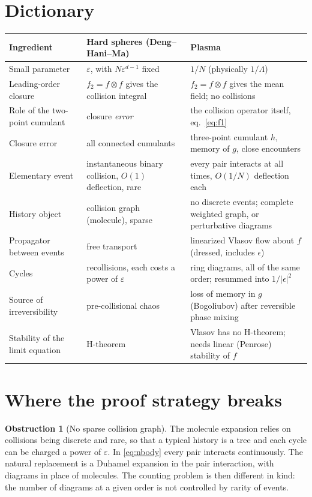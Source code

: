 \documentclass[11pt]{article}
\newcommand{\eps}{\varepsilon}
\newcommand{\diel}{\epsilon}
\theoremstyle{definition}
\newtheorem{obstruction}{Obstruction}
\begin{document}
\section{Dictionary}

\begin{center}
\renewcommand{\arraystretch}{1.5}
\begin{tabular}{>{\raggedright}p{3.1cm}>{\raggedright}p{5.2cm}p{6.2cm}}
  Ingredient & Hard spheres (Deng--Hani--Ma) & Plasma \\ \hline
  Small parameter & $\eps$, with $N\eps^{d-1}$ fixed
    & $1/N$ (physically $1/\Lambda$) \\
  Leading-order closure & $f_2 = f\otimes f$ gives the collision integral
    & $f_2 = f\otimes f$ gives the mean field; no collisions \\
  Role of the two-point cumulant & closure \emph{error}
    & the collision operator itself, eq.~\eqref{eq:f1} \\
  Closure error & all connected cumulants
    & three-point cumulant $h$, memory of $g$, close encounters \\
  Elementary event & instantaneous binary collision, $O(1)$ deflection, rare
    & every pair interacts at all times, $O(1/N)$ deflection each \\
  History object & collision graph (molecule), sparse
    & no discrete events; complete weighted graph, or perturbative diagrams \\
  Propagator between events & free transport
    & linearized Vlasov flow about $f$ (dressed, includes $\diel$) \\
  Cycles & recollisions, each costs a power of $\eps$
    & ring diagrams, all of the same order; resummed into $1/|\diel|^2$ \\
  Source of irreversibility & pre-collisional chaos
    & loss of memory in $g$ (Bogoliubov) after reversible phase mixing \\
  Stability of the limit equation & H-theorem
    & Vlasov has no H-theorem; needs linear (Penrose) stability of $f$ \\
\end{tabular}
\end{center}

\section{Where the proof strategy breaks}

\begin{obstruction}[No sparse collision graph]
The molecule expansion relies on collisions being discrete and rare, so that
a typical history is a tree and each cycle can be charged a power of $\eps$.
In \eqref{eq:nbody} every pair interacts continuously. The natural
replacement is a Duhamel expansion in the pair interaction, with diagrams in
place of molecules. The counting problem is then different in kind: the
number of diagrams at a given order is not controlled by rarity of events.
\end{obstruction}
\end{document}
